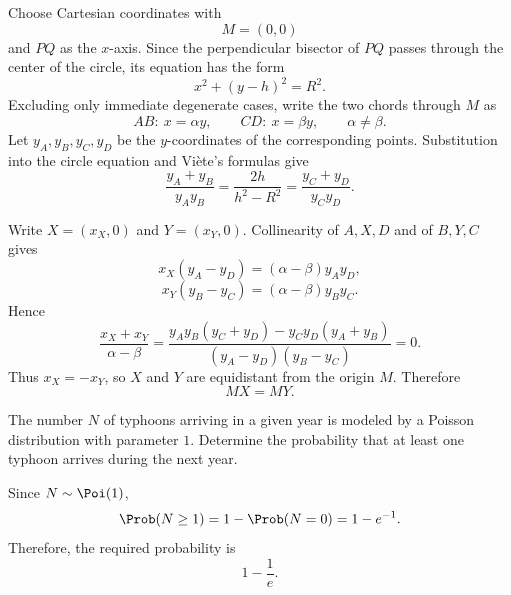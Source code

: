     \begin{solution}
        Choose Cartesian coordinates with
        \[
            M=(0,0)
        \]
        and $PQ$ as the $x$-axis. Since the perpendicular bisector of $PQ$
        passes through the center of the circle, its equation has the form
        \[
            x^2+(y-h)^2=R^2.
        \]
        Excluding only immediate degenerate cases, write the two chords through
        $M$ as
        \[
            AB:\ x=\alpha y,
            \qquad
            CD:\ x=\beta y,
            \qquad
            \alpha\neq\beta.
        \]
        Let $y_A,y_B,y_C,y_D$ be the $y$-coordinates of the corresponding
        points. Substitution into the circle equation and Vi\`ete's formulas
        give
        \[
            \frac{y_A+y_B}{y_Ay_B}
            =
            \frac{2h}{h^2-R^2}
            =
            \frac{y_C+y_D}{y_Cy_D}.
        \]

        Write $X=(x_X,0)$ and $Y=(x_Y,0)$. Collinearity of $A,X,D$ and of
        $B,Y,C$ gives
        \[
            x_X(y_A-y_D)
            =
            (\alpha-\beta)y_Ay_D,
        \]
        \[
            x_Y(y_B-y_C)
            =
            (\alpha-\beta)y_By_C.
        \]
        Hence
        \[
            \frac{x_X+x_Y}{\alpha-\beta}
            =
            \frac{
                y_Ay_B(y_C+y_D)-y_Cy_D(y_A+y_B)
            }{
                (y_A-y_D)(y_B-y_C)
            }
            =0.
        \]
        Thus $x_X=-x_Y$, so $X$ and $Y$ are equidistant from the origin $M$.
        Therefore
        \[
            \boxed{MX=MY}.
        \]
    \end{solution}

    \begin{expectedproblem}
        The number $N$ of typhoons arriving in a given year is modeled by a
        Poisson distribution with parameter $1$. Determine the probability that
        at least one typhoon arrives during the next year.
    \end{expectedproblem}

    \begin{solution}
        Since $N\sim\Poi(1)$,
        \[
            \Prob(N\geq1)
            =
            1-\Prob(N=0)
            =
            1-e^{-1}.
        \]
        Therefore, the required probability is
        \[
            \boxed{1-\frac{1}{e}}.
        \]
    \end{solution}

